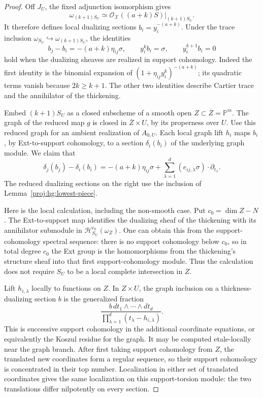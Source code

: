 \documentclass[11pt,letterpaper]{article}
\newcommand{\PP}{\mathbb{P}}
\newcommand{\OO}{\mathcal{O}}
\theoremstyle{definition}
\theoremstyle{remark}
\begin{document}
\begin{proof}
Off \(J_U\), the fixed adjunction isomorphism gives
\[
 \omega_{(k+1)S_U}
 \simeq\OO_{\mathcal X}((a+k)S)|_{(k+1)S_U}.
\]
It therefore defines local dualizing sections
\(b_i=y_i^{-(a+k)}\).  Under the trace inclusion
\(\omega_{S_U}\hookrightarrow\omega_{(k+1)S_U}\), the identities
\begin{equation}\label{proj:hg:dualizing-errors}
 b_j-b_i=-(a+k)\eta_{ij}\sigma,\qquad
 y_i^kb_i=\sigma,\qquad y_i^{k+1}b_i=0
\end{equation}
hold when the dualizing sheaves are realized in support
cohomology.  Indeed the first identity is the binomial expansion
of \((1+\eta_{ij}y_i^k)^{-(a+k)}\); its quadratic terms vanish
because \(2k\geq k+1\).  The other two identities describe
Cartier trace and the annihilator of the thickening.

Embed \((k+1)S_U\) as a closed subscheme of a smooth open
\(Z\subset\overline Z=\PP^m\).  The graph of the reduced map
\(g\) is closed in \(\overline Z\times U\), by its properness over
\(U\).  Use this reduced graph for an ambient realization of
\(A_{0,U}\).  Each local graph lift \(h_i\) maps \(b_i\), by
Ext-to-support cohomology, to a section \(\delta_i(b_i)\) of the
underlying graph module.  We claim that
\begin{equation}\label{proj:hg:graph-identity}
 \delta_j(b_j)-\delta_i(b_i)
 =
 -(a+k)\eta_{ij}\sigma
 +\sum_{\lambda=1}^d
          (e_{ij,\lambda}\sigma)\cdot\partial_{t_\lambda}.
\end{equation}
The reduced dualizing sections on the right use the inclusion
of Lemma~\ref{proj:hg:lowest-piece}.

Here is the local calculation, including the non-smooth case.
Put \(c_0=\dim Z-N\).
The Ext-to-support map identifies the dualizing sheaf of the
thickening with its annihilator submodule in
\(\mathcal H^{c_0}_{S_U}(\omega_Z)\).  One can obtain this from
the support-cohomology spectral sequence: there is no support
cohomology below \(c_0\), so in total degree \(c_0\) the Ext
group is the homomorphisms from the thickening's structure sheaf
into that first support-cohomology module.  Thus the calculation
does not require \(S_U\) to be a local complete intersection in
\(Z\).

Lift \(h_{i,\lambda}\) locally to functions on \(Z\).  In
\(Z\times U\), the graph inclusion on a thickness-dualizing
section \(b\) is the generalized fraction
\[
 \frac{b\,dt_1\wedge\cdots\wedge dt_d}
      {\prod_{\lambda=1}^d(t_\lambda-h_{i,\lambda})}.
\]
This is successive support cohomology in the additional
coordinate equations, or equivalently the Koszul residue for
the graph.  It may be computed etale-locally near the graph
branch.  After first taking support cohomology from \(Z\), the
translated new coordinates form a regular sequence, so their
support cohomology is concentrated in their top number.
Localization in either set of translated coordinates gives the
same localization on this support-torsion module: the two
translations differ nilpotently on every section.


\end{proof}
\end{document}
